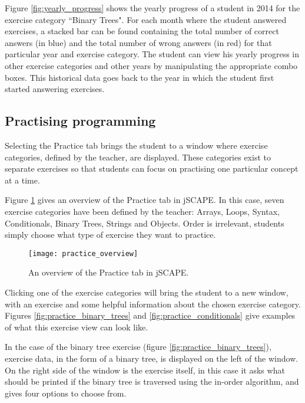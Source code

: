 Figure \ref{fig:yearly_progress} shows the yearly progress of a student in 2014 for the exercise category ``Binary Trees". For each month where the student answered exercises, a stacked bar can be found containing the total number of correct answers (in blue) and the total number of wrong answers (in red) for that particular year and exercise category. The student can view his yearly progress in other exercise categories and other years by manipulating the appropriate combo boxes. This historical data goes back to the year in which the student first started answering exercises.

\subsection{Practising programming}
Selecting the Practice tab brings the student to a window where exercise categories, defined by the teacher, are displayed. These categories exist to separate exercises so that students can focus on practising one particular concept at a time. \newline

Figure \ref{fig:practice_overview} gives an overview of the Practice tab in jSCAPE. In this case, seven exercise categories have been defined by the teacher: Arrays, Loops, Syntax, Conditionals, Binary Trees, Strings and Objects. Order is irrelevant, students simply choose what type of exercise they want to practice.

\begin{figure}[H]
\centering
\texttt{[image: practice\_overview]}
\caption{An overview of the Practice tab in jSCAPE.}
\label{fig:practice_overview}
\end{figure}

Clicking one of the exercise categories will bring the student to a new window, with an exercise and some helpful information about the chosen exercise category.
Figures \ref{fig:practice_binary_trees} and \ref{fig:practice_conditionals} give examples of what this exercise view can look like.\newline

In the case of the binary tree exercise (figure \ref{fig:practice_binary_trees}), exercise data, in the form of a binary tree, is displayed on the left of the window. On the right side of the window is the exercise itself, in this case it asks what should be printed if the binary tree is traversed using the in-order algorithm, and gives four options to choose from. \newline

